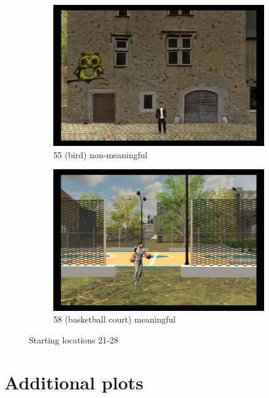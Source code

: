 \begin{figure}[!htb]
	\begin{subfigure}[b]{0.48\linewidth}
		\includegraphics[width=\linewidth]{figures/starting_locations_appx/55_R(bird)_A.PNG}
		\caption{55 (bird) non-meaningful}
		\label{fig:55_R(bird)_A}
	\end{subfigure}
	\begin{subfigure}[b]{0.48\linewidth}
		\includegraphics[width=\linewidth]{figures/starting_locations_appx/58_basketball court_A.PNG}
		\caption{58 (basketball court) meaningful}
		\label{fig:58_basketball court_A}
	\end{subfigure}
	
	\caption[Starting locations 21-28]{Starting locations 21-28}
	\label{fig:starting_locations_21-28}
\end{figure}

\chapter{Additional plots}\label{appx:plots}

